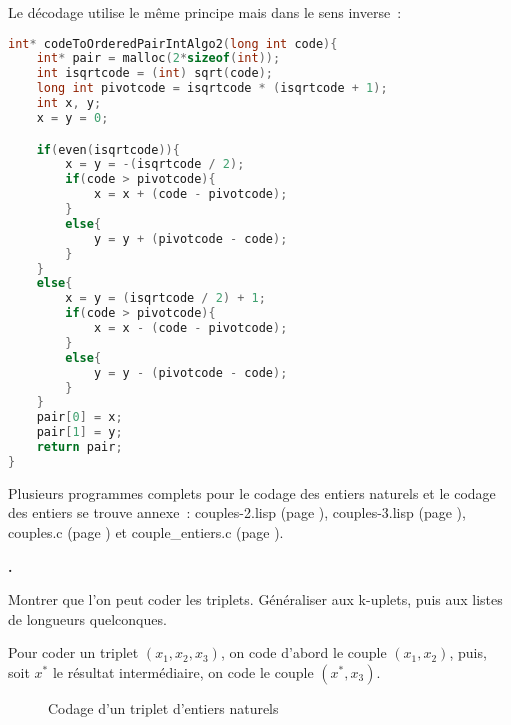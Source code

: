 \documentclass{article}
\newcounter{enoncecount}
\newenvironment{enonce}
{
\stepcounter{enoncecount}
\bf\small \arabic{enoncecount}.
\begin{bf}
}
{
\end{bf}
}
\begin{document}
Le décodage utilise le même principe mais dans le sens inverse~:

\begin{lstlisting}[language=C]
int* codeToOrderedPairIntAlgo2(long int code){
	int* pair = malloc(2*sizeof(int));
	int isqrtcode = (int) sqrt(code);
	long int pivotcode = isqrtcode * (isqrtcode + 1);
	int x, y;
	x = y = 0;	

	if(even(isqrtcode)){
		x = y = -(isqrtcode / 2);
		if(code > pivotcode){
			x = x + (code - pivotcode);
		}
		else{
			y = y + (pivotcode - code);
		}
	}
	else{
		x = y = (isqrtcode / 2) + 1;
		if(code > pivotcode){
			x = x - (code - pivotcode);
		}
		else{
			y = y - (pivotcode - code); 
		}
	}
	pair[0] = x;
	pair[1] = y; 
	return pair;
}
\end{lstlisting}

Plusieurs programmes complets pour le codage des entiers naturels et le codage des entiers se trouve annexe~: couples-2.lisp (page \pageref{couples2lisp}), couples-3.lisp (page \pageref{couples3lisp}), couples.c (page \pageref{couplesc}) et couple\_entiers.c (page \pageref{coupleentiersc}).



\begin{enonce}
Montrer que l'on peut coder les triplets. Généraliser aux k-uplets, puis aux listes de longueurs quelconques.
\end{enonce}

Pour coder un triplet $(x_1, x_2, x_3)$, on code d'abord le couple $(x_1, x_2)$, puis, soit $x^*$ le résultat intermédiaire, on code le couple $(x^*, x_3)$.

\begin{figure}[ht!]
  \centering
  \caption{Codage d'un triplet d'entiers naturels}
  \label{fig:codage-couple}
\end{figure}
\end{document}
